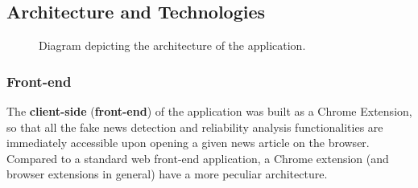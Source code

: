 \subsection{Architecture and Technologies}

\begin{figure}[H]
  \centering
  \caption{Diagram depicting the architecture of the application.}
\end{figure}
  
\subsubsection{Front-end}
  The \textbf{client-side} (\textbf{front-end}) of the application was built as a Chrome Extension, so that all the fake news detection and reliability analysis functionalities are immediately accessible upon opening a given news article on the browser. Compared to a standard web front-end application, a Chrome extension (and browser extensions in general) have a more peculiar architecture. 

